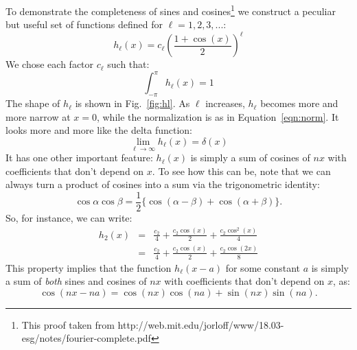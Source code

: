 \documentclass[12pt]{article}
\begin{document}
\noindent
To demonstrate the completeness of sines and cosines\footnote{This proof taken from http://web.mit.edu/jorloff/www/18.03-esg/notes/fourier-complete.pdf} we construct a peculiar but useful set of functions defined for $\ell=1,2,3,...$:
\begin{displaymath}
h_\ell(x) = c_\ell \left(\frac{1 + \cos(x)}{2}\right)^\ell
\end{displaymath}
We chose each factor $c_\ell$ such that:
\begin{displaymath}
\int_{-\pi}^{\pi} h_\ell(x) = 1
\end{displaymath}
The shape of $h_\ell$ is shown in Fig.~\ref{fig:hl}.  As $\ell$ increases, $h_\ell$ becomes more and more narrow at $x=0$, while the normalization is as in Equation~\ref{eqn:norm}.  It looks more and more like the delta function:
\begin{displaymath}
\lim_{\ell \to \infty} h_\ell(x) = \delta(x)
\end{displaymath}
It has one other important feature:  $h_\ell(x)$ is simply a sum of cosines of $nx$ with coefficients that don't depend on $x$.  To see how this can be, note that we can always turn a product of cosines into a sum via the trigonometric identity:
\begin{displaymath}
\cos \alpha \cos \beta = \frac{1}{2} \{\cos(\alpha - \beta) + \cos(\alpha + \beta)\}.
\end{displaymath}
So, for instance, we can write:
\begin{eqnarray*}
h_2(x) &=& \frac{c_2}{4} + \frac{c_2\cos(x)}{2}+\frac{c_2\cos^2(x)}{4} \\
           &=& \frac{c_2}{4} + \frac{c_2\cos(x)}{2}+\frac{c_2\cos(2x)}{8}
\end{eqnarray*}
This property implies that the function $h_\ell(x-a)$ for some constant $a$ is simply a sum of {\em both} sines and cosines of $nx$ with coefficients that don't depend on $x$, as:
\begin{displaymath}
\cos(nx-na) = \cos(nx)\cos(na) + \sin(nx)\sin(na).
\end{displaymath}
\end{document}

